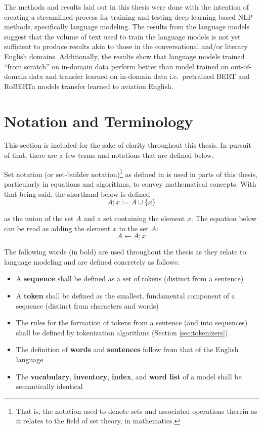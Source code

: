 \documentclass[12pt]{article}
\begin{document}
The methods and results laid out in this thesis were done with the intention of creating a streamlined process for training and testing deep learning
based NLP methods, specifically language modeling. The results from the language models suggest that the volume of text used to train the language
models is not yet sufficient to produce results akin to those in the conversational and/or literary English domains. Additionally, the results show
that language models trained ``from scratch'' on in-domain data perform better than model trained on out-of-domain data and transfer learned on
in-domain data i.e.~pretrained BERT and RoBERTa models transfer learned to aviation English.

\section{Notation and Terminology}
This section is included for the sake of clarity throughout this thesis. In pursuit of that, there are a few terms and notations that are defined
below.

Set notation (or set-builder notation)\footnote{That is, the notation used to denote sets and associated operations therein as it relates to the field
    of set theory, in mathematics.} as defined in \cite{jech_chapter_1978} is used in parts of this thesis, particularly in equations and algorithms,
to convey mathematical concepts. With that being said, the shorthand below is defined
\begin{equation*}
    A; x := A \cup \{x\}
\end{equation*}

\noindent
as the union of the set $A$ and a set containing the element $x$. The equation below can be read as adding the element $x$ to the set $A$:
\begin{equation*}
    A \leftarrow A; x
\end{equation*}

The following words (in bold) are used throughout the thesis as they relate to language modeling and are defined concretely as follows:
\begin{itemize}
    \item A \textbf{sequence} shall be defined as a set of tokens (distinct from a sentence)
    \item A \textbf{token} shall be defined as the smallest, fundamental component of a sequence (distinct from characters and words)
    \item The rules for the formation of tokens from a sentence (and into sequences) shall be defined by tokenization algorithms (Section
          \ref{sec:tokenizers})
    \item The definition of \textbf{words} and \textbf{sentences} follow from that of the English language
    \item The \textbf{vocabulary}, \textbf{inventory}, \textbf{index}, and \textbf{word list} of a model shall be semantically identical
\end{itemize}
\end{document}
